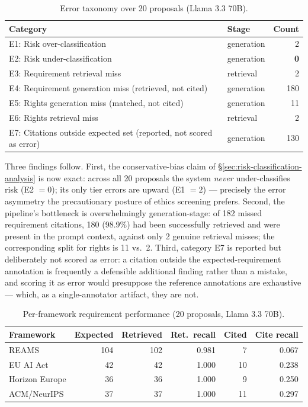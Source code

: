 \begin{table}[htbp]
\centering
\caption{Error taxonomy over 20 proposals (Llama 3.3 70B).}
\label{tab:error-taxonomy}
\begin{tabular}{llr}
\toprule
\textbf{Category} & \textbf{Stage} & \textbf{Count} \\
\midrule
E1: Risk over-classification & generation & 2 \\
E2: Risk under-classification & generation & \textbf{0} \\
E3: Requirement retrieval miss & retrieval & 2 \\
E4: Requirement generation miss (retrieved, not cited) & generation & 180 \\
E5: Rights generation miss (matched, not cited) & generation & 11 \\
E6: Rights retrieval miss & retrieval & 2 \\
E7: Citations outside expected set (reported, not scored as error) & generation & 130 \\
\bottomrule
\end{tabular}
\end{table}

Three findings follow. First, the conservative-bias claim of \S\ref{sec:risk-classification-analysis} is now exact: across all 20 proposals the system \emph{never} under-classifies risk (E2 $=0$); its only tier errors are upward (E1 $=2$) --- precisely the error asymmetry the precautionary posture of ethics screening prefers. Second, the pipeline's bottleneck is overwhelmingly generation-stage: of 182 missed requirement citations, 180 (98.9\%) had been successfully retrieved and were present in the prompt context, against only 2 genuine retrieval misses; the corresponding split for rights is 11 vs.\ 2. Third, category E7 is reported but deliberately not scored as error: a citation outside the expected-requirement annotation is frequently a defensible additional finding rather than a mistake, and scoring it as error would presuppose the reference annotations are exhaustive --- which, as a single-annotator artifact, they are not.

\begin{table}[htbp]
\centering
\caption{Per-framework requirement performance (20 proposals, Llama 3.3 70B).}
\label{tab:per-framework}
\begin{tabular}{lrrrrr}
\toprule
\textbf{Framework} & \textbf{Expected} & \textbf{Retrieved} & \textbf{Ret.\ recall} & \textbf{Cited} & \textbf{Cite recall} \\
\midrule
REAMS & 104 & 102 & 0.981 & 7 & 0.067 \\
EU AI Act & 42 & 42 & 1.000 & 10 & 0.238 \\
Horizon Europe & 36 & 36 & 1.000 & 9 & 0.250 \\
ACM/NeurIPS & 37 & 37 & 1.000 & 11 & 0.297 \\
\bottomrule
\end{tabular}
\end{table}

